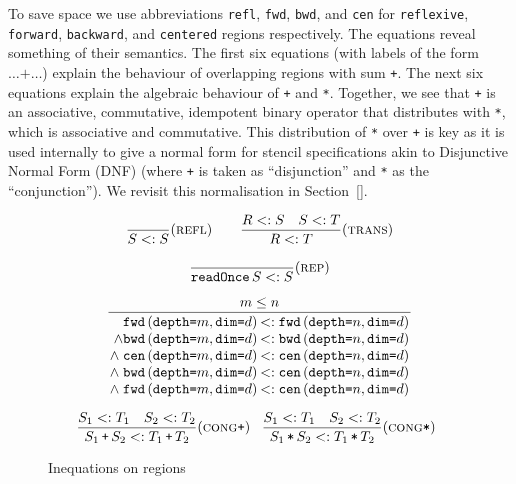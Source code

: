 \documentclass[9pt]{sigplanconf}
\theoremstyle{definition}
\newcommand{\term}[1]{\texttt{#1}}
\newcommand{\stenFwdS}[2]{\term{fwd} \, (\term{depth=}#1,
  \term{dim=}#2)}
\newcommand{\stenBwdS}[2]{\term{bwd} \, (\term{depth=}#1,
  \term{dim=}#2)}
\newcommand{\stenCenS}[2]{\term{cen} \, (\term{depth=}#1,
  \term{dim=}#2)}
\begin{document}
To save space we use abbreviations
\term{refl}, \term{fwd}, \term{bwd}, and \term{cen} for \term{reflexive},
\term{forward}, \term{backward}, and \term{centered} regions respectively.
The equations reveal something of their semantics.  The first six
equations (with labels of the form $\ldots \texttt{+} \ldots$)
explain the behaviour of overlapping regions with sum
\term{+}. The next six equations explain the algebraic behaviour of
\term{+} and \term{*}.  Together, we see that \term{+} is an
associative, commutative, idempotent binary operator that distributes
with \term{*}, which is associative and commutative. This distribution
of \term{*} over \term{+} is key as it is used internally to give a
normal form for stencil specifications akin to Disjunctive Normal Form
(DNF) (where \term{+} is taken as ``disjunction'' and \term{*} as the
``conjunction''). We revisit this normalisation in Section~\ref{}.

\begin{figure}[t]
\begin{align*}
\begin{array}{c}
\dfrac{}{S <: S}(\textsc{refl}) \qquad \dfrac{R <: S \quad S <: T}{R <:
  T}(\textsc{trans}) \\[1.5em]
\dfrac{}{\texttt{readOnce} \, S <: S}(\textsc{rep})
\\[1.5em]
\setlength{\arraycolsep}{0.1em}
\dfrac{\hspace{3em} m \leq n \hspace{3em}}
{\begin{array}{rl}
\stenFwdS{m}{d} & <: \stenFwdS{n}{d}
\\
\wedge \stenBwdS{m}{d} & <: \stenBwdS{n}{d}
\\
\wedge \; \stenCenS{m}{d} & <: \stenCenS{n}{d}
\\
\wedge \; \stenBwdS{m}{d} & <: \stenCenS{n}{d} \\
\wedge \; \stenFwdS{m}{d} & <: \stenCenS{n}{d} \\[1em]
\end{array}} \\[2.5em]
\hspace{-0.5em}
\dfrac{S_1 <: T_1 \quad S_2 <: T_2}
      {S_1 \, \texttt{+} \, S_2 <: T_1 \, \texttt{+} \, T_2}
(\textsc{cong}\texttt{+}) \;\;\;
\dfrac{S_1 <: T_1 \quad S_2 <: T_2}
      {S_1 \, \texttt{*} \, S_2 <: T_1 \, \texttt{*} \, T_2}
(\textsc{cong}\texttt{*})
\end{array}
\end{align*}
\caption{Inequations on regions}
\label{fig:inequations}
\end{figure}
\end{document}
